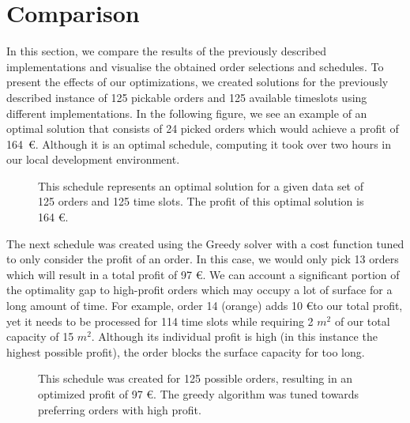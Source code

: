 \documentclass{article}
\begin{document}
\section{Comparison}\label{sec:comp}
In this section, we compare the results of the previously described implementations and visualise the obtained order selections and schedules. To present the effects of our optimizations, we created solutions for the previously described instance of 125 pickable orders and 125 available timeslots using different implementations. 
In the following figure, we see an example of an optimal solution that consists of 24 picked orders which would achieve a profit of 164~\euro{}. Although it is an optimal schedule, computing it took over two hours in our local development environment.
\begin{figure}[H]
\centering

\caption[Example of an Optimal Schedule]{This schedule represents an optimal solution for a given data set of 125 orders and 125 time slots. The profit of this optimal solution is 164 \euro{}.}
\label{fig:extended_schedule_opt}
\end{figure}
The next schedule was created using the Greedy solver with a cost function tuned to only consider the profit of an order. In this case, we would only pick 13 orders which will result in a total profit of 97 \euro{}. We can account a significant portion of the optimality gap to high-profit orders which may occupy a lot of surface for a long amount of time. For example, order 14 (orange) adds 10 \euro to our total profit, yet it needs to be processed for 114 time slots while requiring 2 $m^2$ of our total capacity of 15 $m^2$. Although its individual profit is high (in this instance the highest possible profit), the order blocks the surface capacity for too long.
\begin{figure}[H]
\centering

\caption[Example of an Approximated Schedule using Greedy]{This schedule was created for 125 possible orders, resulting in an optimized profit of 97 \euro{}. The greedy algorithm was tuned towards preferring orders with high profit.}
\label{fig:125_profit_approx}
\end{figure}
\end{document}
